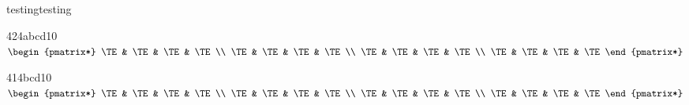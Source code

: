

\def\AllTE{%
\TE & \TE & \TE & \TE \\
\TE & \TE & \TE & \TE \\
\TE & \TE & \TE & \TE \\
\TE & \TE & \TE & \TE }%
\def\GenTLArray#1#2#3#4#5#6{%
\begin{TLArray}{4}{#1}{#2}{#3}{#4}{#5}{#6}{1}{0}
\ensuremath{\begin{pmatrix*}
\AllTE
\end{pmatrix*}}
\end{TLArray}}


\begin{frame}{testing}{testing}

\GenTLArray{2}{4}{a}{b}{c}{d}

\GenTLArray{1}{4}{\RootTwo{}}{b}{c}{d}


\end{frame}

